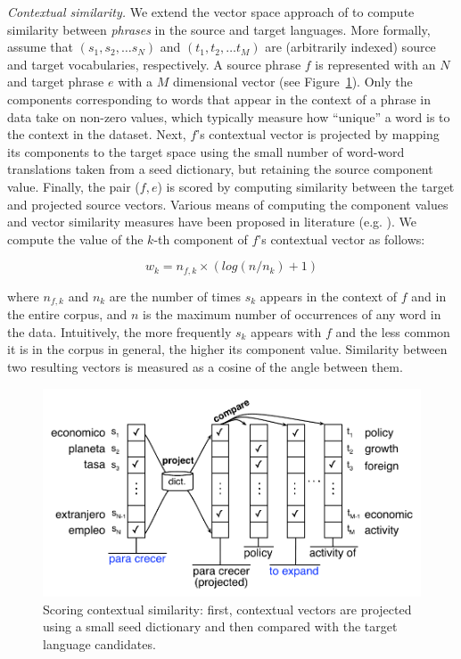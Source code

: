 \documentclass[11pt]{article}
\newcommand{\figref}[1]{Figure~\ref{#1}}
\newcommand{\paraheader}[1]{\vskip 0.05in \noindent\emph{#1}}
\begin{document}
\paraheader{Contextual similarity.}  We extend the vector space approach of  to compute similarity between \emph{phrases} in the source and target languages.  More formally, assume that $(s_{1}, s_{2}, \dots s_{N})$ and $(t_{1}, t_{2}, \dots t_{M})$ are (arbitrarily indexed) source and target vocabularies, respectively.  A source phrase $f$ is represented with an $N$ and target phrase $e$ with a $M$ dimensional vector (see \figref{fig:contextual}).  Only the components corresponding to words that appear in the context of a phrase in data take on non-zero values, which typically measure how ``unique'' a word is to the context in the dataset.  Next, $f$'s contextual vector is projected by mapping its components to the target space using the small number of word-word translations taken from a seed dictionary, but retaining the source component value.  Finally, the pair ($f, e$) is scored by computing similarity between the target  and projected source vectors.  Various means of computing the component values and vector similarity measures have been proposed in literature (e.g. ).  We compute the value of the $k$-th component of $f$'s contextual vector  as follows: 

\begin{equation*}
w_{k} = n_{f,k} \times (log( {n / n_{k}}) + 1)
\end{equation*}

\noindent where $n_{f,k}$ and $n_{k}$ are the number of times $s_{k}$ appears in the context of $f$ and in the entire corpus, and $n$ is the maximum number of occurrences of any word in the data.  Intuitively, the more frequently $s_{k}$ appears with $f$ and the less common it is in the corpus in general, the higher its component value.  Similarity between two resulting vectors is measured as a cosine of the angle between them.

\begin{figure}[t]
\includegraphics[width=\linewidth]{../figures/contextual/contextual}
\caption{Scoring contextual similarity: first, contextual vectors are projected using a small seed dictionary and then compared with the target language candidates.}
\label{fig:contextual}
\end{figure}
\end{document}
